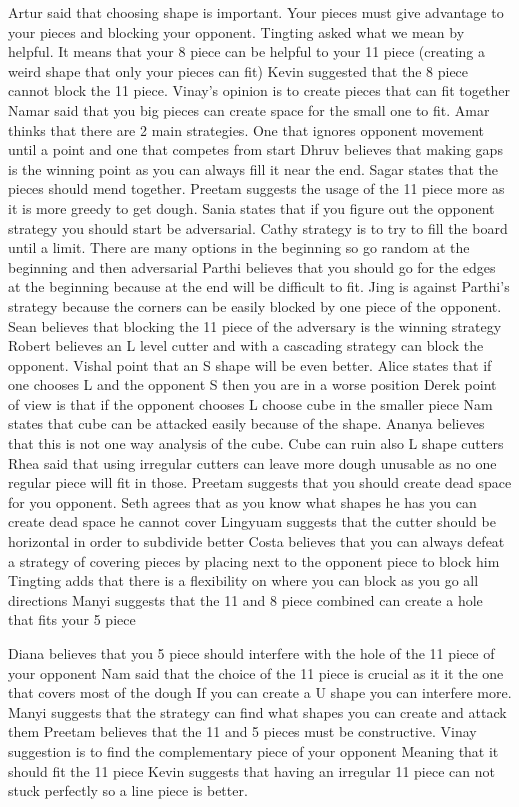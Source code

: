 Artur said that choosing shape is important. Your pieces must give advantage to your pieces and blocking your opponent.
Tingting asked what we mean by helpful. It means that your 8 piece can be helpful to your 11 piece (creating a weird shape that only your pieces can fit)
Kevin suggested that the 8 piece cannot block the 11 piece.
Vinay’s opinion is to create pieces that can fit together
Namar said that you big pieces can create space for the small one to fit.
Amar thinks that there are 2 main strategies. One that ignores opponent movement until a point and one that competes from start
Dhruv believes that making gaps is the winning point as you can always fill it near the end.
Sagar states that the pieces should mend together.
Preetam suggests the usage of the 11 piece more as it is more greedy to get dough.
Sania states that if you figure out the opponent strategy you should start be adversarial.
Cathy strategy is to try to fill the board until a limit. There are many options in the beginning so go random at the beginning and then adversarial
Parthi believes that you should go for the edges at the beginning because at the end will be difficult to fit.
Jing is against Parthi's strategy because the corners can be easily blocked by one piece of the opponent.
Sean believes that blocking the 11 piece of the adversary is the winning strategy
Robert believes an L level cutter and with a cascading strategy can block the opponent.
Vishal point that an S shape will be even better.
Alice states that if one chooses L and the opponent S then you are in a worse position
Derek point of view is that if the opponent chooses L choose cube in the smaller piece
Nam states that cube can be attacked easily because of the shape.
Ananya believes that this is not one way analysis of the cube. Cube can ruin also L shape cutters
Rhea said that using irregular cutters can leave more dough unusable as no one regular piece will fit in those.
Preetam suggests that you should create dead space for you opponent.
Seth agrees that as you know what shapes he has you can create dead space he cannot cover
Lingyuam suggests that the cutter should be horizontal in order to subdivide better
Costa believes that you can always defeat a strategy of covering pieces by placing next to the opponent piece to block him
Tingting adds that there is a flexibility on where you can block as you go all directions
Manyi suggests that the 11 and 8 piece combined can create a hole that fits your 5 piece

Diana believes that you 5 piece should interfere with the hole of the 11 piece of your opponent
Nam said that the choice of the 11 piece is crucial as it it the one that covers most of the dough
If you can create a U shape you can interfere more.
Manyi suggests that the strategy can find what shapes you can create and attack them
Preetam believes that the 11 and 5 pieces must be constructive.
Vinay suggestion is to find the complementary piece of your opponent
Meaning that it should fit the 11 piece
Kevin suggests that having an irregular 11 piece can not stuck perfectly so a line piece is better.
